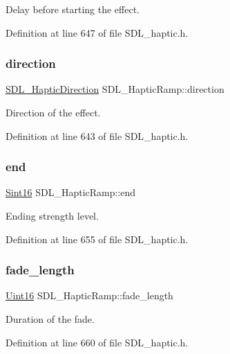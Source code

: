 Delay before starting the effect. 

Definition at line 647 of file S\+D\+L\+\_\+haptic.\+h.

\mbox{\label{struct_s_d_l___haptic_ramp_a6fb6c67ccf262b8f3ec08bcdf08f9965}} 
\subsubsection{\texorpdfstring{direction}{direction}}
{\footnotesize\ttfamily \mbox{\hyperlink{struct_s_d_l___haptic_direction}{S\+D\+L\+\_\+\+Haptic\+Direction}} S\+D\+L\+\_\+\+Haptic\+Ramp\+::direction}

Direction of the effect. 

Definition at line 643 of file S\+D\+L\+\_\+haptic.\+h.

\mbox{\label{struct_s_d_l___haptic_ramp_a16dd3ee307795248e21ee45ba8fb4c6c}} 
\subsubsection{\texorpdfstring{end}{end}}
{\footnotesize\ttfamily \mbox{\hyperlink{_s_d_l__stdinc_8h_a9d0257032c0e146ab6121bf0122712f5}{Sint16}} S\+D\+L\+\_\+\+Haptic\+Ramp\+::end}

Ending strength level. 

Definition at line 655 of file S\+D\+L\+\_\+haptic.\+h.

\mbox{\label{struct_s_d_l___haptic_ramp_ad58a8f7cfdf659b45f0503fc56db7436}} 
\subsubsection{\texorpdfstring{fade\_length}{fade\_length}}
{\footnotesize\ttfamily \mbox{\hyperlink{_s_d_l__stdinc_8h_a31fcc0a076c9068668173ee26d33e42b}{Uint16}} S\+D\+L\+\_\+\+Haptic\+Ramp\+::fade\+\_\+length}

Duration of the fade. 

Definition at line 660 of file S\+D\+L\+\_\+haptic.\+h.

